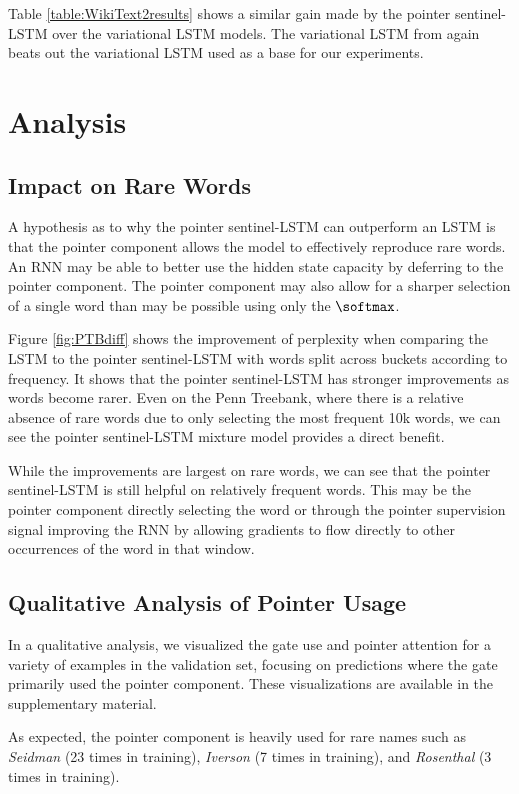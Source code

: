 Table \ref{table:WikiText2results} shows a similar gain made by the pointer sentinel-LSTM over the variational LSTM models. The variational LSTM from \citet{Gal2015} again beats out the variational LSTM used as a base for our experiments.

\section{Analysis}
\subsection{Impact on Rare Words} A hypothesis as to why the pointer sentinel-LSTM can outperform an LSTM is that the pointer component allows the model to effectively reproduce rare words. An RNN may be able to better use the hidden state capacity by deferring to the pointer component. The pointer component may also allow for a sharper selection of a single word than may be possible using only the $\softmax$.

Figure \ref{fig:PTBdiff} shows the improvement of perplexity when comparing the LSTM to the pointer sentinel-LSTM with words split across buckets according to frequency. It shows that the pointer sentinel-LSTM has stronger improvements as words become rarer. Even on the Penn Treebank, where there is a relative absence of rare words due to only selecting the most frequent 10k words, we can see the pointer sentinel-LSTM mixture model provides a direct benefit.

While the improvements are largest on rare words, we can see that the pointer sentinel-LSTM is still helpful on relatively frequent words. This may be the pointer component directly selecting the word or through the pointer supervision signal improving the RNN by allowing gradients to flow directly to other occurrences of the word in that window.

\subsection{Qualitative Analysis of Pointer Usage}

In a qualitative analysis, we visualized the gate use and pointer attention for a variety of examples in the validation set, focusing on predictions where the gate primarily used the pointer component. These visualizations are available in the supplementary material.

As expected, the pointer component is heavily used for rare names such as \emph{Seidman} (23 times in training), \emph{Iverson} (7 times in training), and \emph{Rosenthal} (3 times in training).

